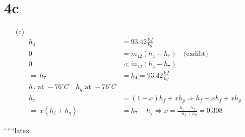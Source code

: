 

\section*{4c}

\begin{itemize}



\item[(c)] 
    \begin{align*}
        h_4 &= 93.42 \frac{kJ}{kg} \\
        0 &= \dot{m}_{12} (h_4 - h_7) \quad \text{(exdibt)} \\
        0 &< \dot{m}_{12} (h_4 - h_7) \\
        \Rightarrow h_7 &= h_4 = 93.42 \frac{kJ}{kg} \\
        h_{f} \text{ at } -76^\circ C \quad h_{g} \text{ at } -76^\circ C \\
        h_7 &= (1 - x) h_f + x h_g \Rightarrow h_f - x h_f + x h_g \\
        \Rightarrow x (h_f + h_g) &= h_7 - h_f \Rightarrow x = \frac{h_7 - h_f}{-h_f + h_g} = 0.308
    \end{align*}
\end{itemize}

``````latex